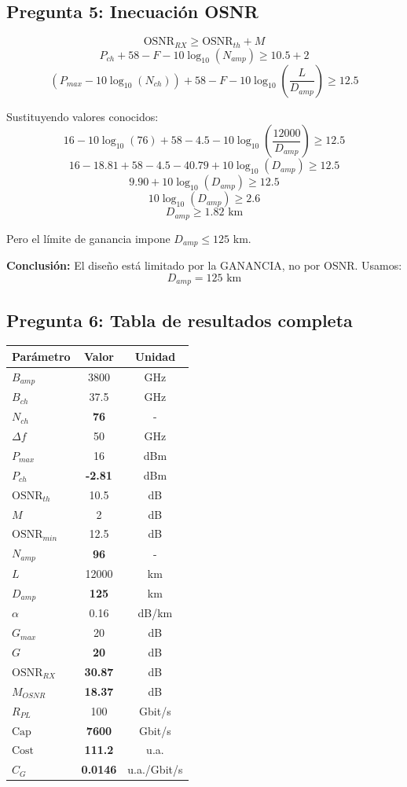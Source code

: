 \documentclass[a4paper,10pt]{article}
\begin{document}
\subsection{Pregunta 5: Inecuación OSNR}

$$\text{OSNR}_{RX} \geq \text{OSNR}_{th} + M$$
$$P_{ch} + 58 - F - 10\log_{10}(N_{amp}) \geq 10.5 + 2$$
$$(P_{max} - 10\log_{10}(N_{ch})) + 58 - F - 10\log_{10}\left(\frac{L}{D_{amp}}\right) \geq 12.5$$

Sustituyendo valores conocidos:
$$16 - 10\log_{10}(76) + 58 - 4.5 - 10\log_{10}\left(\frac{12000}{D_{amp}}\right) \geq 12.5$$
$$16 - 18.81 + 58 - 4.5 - 40.79 + 10\log_{10}(D_{amp}) \geq 12.5$$
$$9.90 + 10\log_{10}(D_{amp}) \geq 12.5$$
$$\boxed{10\log_{10}(D_{amp}) \geq 2.6}$$
$$\boxed{D_{amp} \geq 1.82 \text{ km}}$$

Pero el límite de ganancia impone $D_{amp} \leq 125$ km.

\textbf{Conclusión:} El diseño está limitado por la GANANCIA, no por OSNR. Usamos:
$$\boxed{D_{amp} = 125 \text{ km}}$$

\subsection{Pregunta 6: Tabla de resultados completa}

\begin{center}
\begin{tabular}{lcc}
\toprule
\textbf{Parámetro} & \textbf{Valor} & \textbf{Unidad} \\
\midrule
$B_{amp}$ & 3800 & GHz \\
$B_{ch}$ & 37.5 & GHz \\
$N_{ch}$ & \textbf{76} & - \\
$\Delta f$ & 50 & GHz \\
$P_{max}$ & 16 & dBm \\
$P_{ch}$ & \textbf{-2.81} & dBm \\
$\text{OSNR}_{th}$ & 10.5 & dB \\
$M$ & 2 & dB \\
$\text{OSNR}_{min}$ & 12.5 & dB \\
$N_{amp}$ & \textbf{96} & - \\
$L$ & 12000 & km \\
$D_{amp}$ & \textbf{125} & km \\
$\alpha$ & 0.16 & dB/km \\
$G_{max}$ & 20 & dB \\
$G$ & \textbf{20} & dB \\
$\text{OSNR}_{RX}$ & \textbf{30.87} & dB \\
$M_{OSNR}$ & \textbf{18.37} & dB \\
$R_{PL}$ & 100 & Gbit/s \\
$\text{Cap}$ & \textbf{7600} & Gbit/s \\
$\text{Cost}$ & \textbf{111.2} & u.a. \\
$C_G$ & \textbf{0.0146} & u.a./Gbit/s \\
\bottomrule
\end{tabular}
\end{center}
\end{document}
